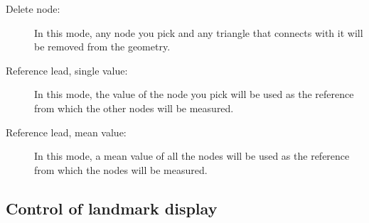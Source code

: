\begin{description}
  \item[Delete node: ] In this mode, any node you pick and any triangle
    that connects with it will be removed from the geometry.
    
  \item[Reference lead, single value: ] In this mode, the value of the node
    you pick will be used as the reference from which the other nodes will
    be measured.
    
  \item[Reference lead, mean value: ] In this mode, a mean value of all the
    nodes will be used as the reference from which the nodes will be
    measured.
\end{description}


\subsection{Control of landmark display}
\label{sec:control-landmarks} 


